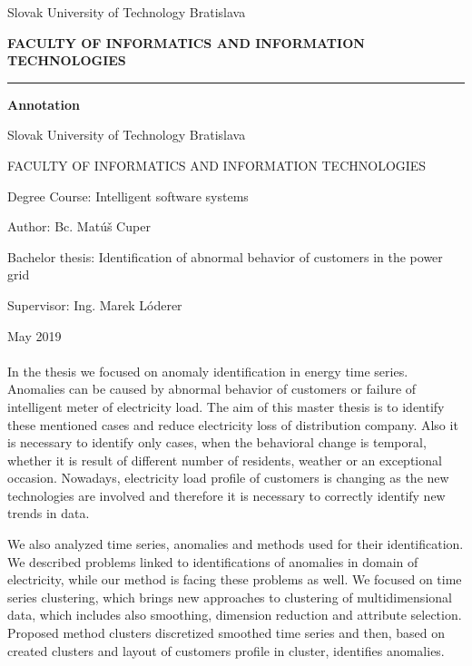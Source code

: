 \documentclass[a4paper,twoside,slovak,12pt,appendix]{article}
\begin{document}
\begin{titlepage}
\begin{center}
  {\small Slovak University of Technology Bratislava \par}
  {\small \textbf{FACULTY OF INFORMATICS AND INFORMATION TECHNOLOGIES}}
  \rule{\textwidth}{1pt}

  \vspace*{1.5cm}
  \begin{Large}
    \textbf{Annotation} \par
  \end{Large}
\end{center}
{Slovak University of Technology Bratislava \par}
{FACULTY OF INFORMATICS AND INFORMATION TECHNOLOGIES \par}
{Degree Course: Intelligent software systems \par}
{Author: Bc. Matúš Cuper \par}
{Bachelor thesis: Identification of abnormal behavior of customers in the power grid \par}
{Supervisor: Ing. Marek Lóderer \par}
{May 2019 \\} \\
In the thesis we focused on anomaly identification in energy time series.
Anomalies can be caused by abnormal behavior of customers or failure of
intelligent meter of electricity load. The aim of this master thesis is to
identify these mentioned cases and reduce electricity loss of distribution
company. Also it is necessary to identify only cases, when the behavioral change
is temporal, whether it is result of different number of residents, weather or
an exceptional occasion. Nowadays, electricity load profile of customers is
changing as the new technologies are involved and therefore it is necessary to
correctly identify new trends in data.

We also analyzed time series, anomalies and methods used for their
identification. We described problems linked to identifications of anomalies in
domain of electricity, while our method is facing these problems as well. We
focused on time series clustering, which brings new approaches to clustering of
multidimensional data, which includes also smoothing, dimension reduction and
attribute selection. Proposed method clusters discretized smoothed time series
and then, based on created clusters and layout of customers profile in cluster,
identifies anomalies.
\end{titlepage}
\end{document}
